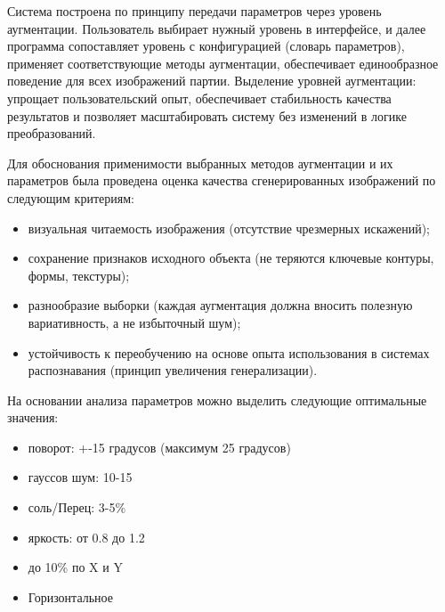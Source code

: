 
Система построена по принципу передачи параметров через уровень аугментации. Пользователь выбирает нужный уровень в интерфейсе, и далее программа сопоставляет уровень с конфигурацией (словарь параметров), применяет соответствующие методы аугментации, обеспечивает единообразное поведение для всех изображений партии. Выделение уровней аугментации: упрощает пользовательский опыт, обеспечивает стабильность качества результатов и позволяет масштабировать систему без изменений в логике преобразований.

Для обоснования применимости выбранных методов аугментации и их параметров была проведена оценка качества сгенерированных изображений по следующим критериям:
\begin{itemize}
	\item визуальная читаемость изображения (отсутствие чрезмерных искажений);
	\item сохранение признаков исходного объекта (не теряются ключевые контуры, формы, текстуры);
	\item разнообразие выборки (каждая аугментация должна вносить полезную вариативность, а не избыточный шум);
	\item устойчивость к переобучению на основе опыта использования в системах распознавания (принцип увеличения генерализации).
\end{itemize}

На основании анализа параметров можно выделить следующие оптимальные значения:

\begin{itemize}
	\item поворот: +-15 градусов (максимум 25 градусов)
	\item гауссов шум: 10-15
	\item соль/Перец: 3-5\%
	\item яркость: от 0.8 до 1.2
	\item до 10\% по X и Y
	\item Горизонтальное
\end{itemize}
